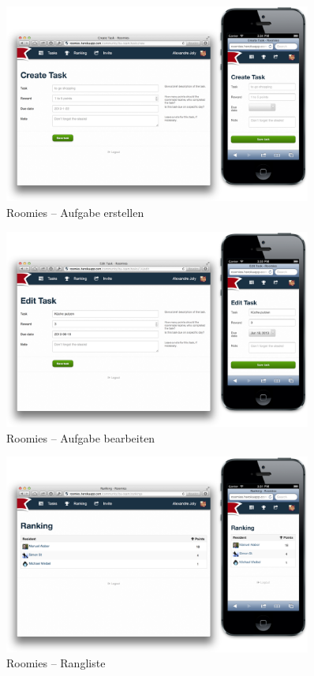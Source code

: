 \begin{figure}[H]
	\centering
	\includegraphics[width=0.9\textwidth]{content/appendix/roomies-screenshots/create_task.png}
	\caption{Roomies -- Aufgabe erstellen}
	\label{fig:roomies-ss-create-task}
\end{figure}

\begin{figure}[H]
	\centering
	\includegraphics[width=0.9\textwidth]{content/appendix/roomies-screenshots/edit_task.png}
	\caption{Roomies -- Aufgabe bearbeiten}
	\label{fig:roomies-ss-edit-task}
\end{figure}

\begin{figure}[H]
	\centering
	\includegraphics[width=0.9\textwidth]{content/appendix/roomies-screenshots/ranking.png}
	\caption{Roomies -- Rangliste}
	\label{fig:roomies-ss-ranking}
\end{figure}

